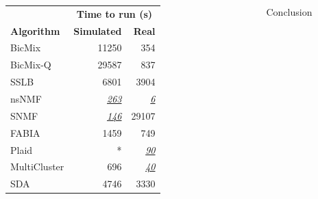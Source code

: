 \documentclass[xcolor=table,final]{beamer}
\newlength{\sepwid}
\newlength{\onecolwid}
\newlength{\twocolwid}
\newcommand{\runnerup}[1] {\underline{\textit{#1}}}
\begin{document}
\begin{frame}[t]
\begin{columns}[t]
\begin{column}{\twocolwid}
\begin{columns}
\begin{column}{\onecolwid}
\begin{table}[t!]
\begin{tabular}{ l | r | r }
    & \multicolumn{2}{c}{\textbf{Time to run (s)}} \\
    \textbf{Algorithm} & \textbf{Simulated} & \textbf{Real} \\ \hline
\cellcolor[HTML]{C50F11}\color[HTML]{FFFFFF}BicMix & 11250 & 354 \\
\cellcolor[HTML]{C50F11}\color[HTML]{FFFFFF}BicMix-Q & 29587 & 837 \\
\cellcolor[HTML]{C50F11}\color[HTML]{FFFFFF}SSLB & 6801 & 3904 \\ \hline
\cellcolor[HTML]{3B93DC}\color[HTML]{FFFFFF}nsNMF & \runnerup{263} & \runnerup{6} \\
\cellcolor[HTML]{3B93DC}\color[HTML]{FFFFFF}SNMF & \runnerup{146} & 29107 \\ \hline
\cellcolor[HTML]{50bd4c}\color[HTML]{FFFFFF}FABIA & 1459 & 749 \\
\cellcolor[HTML]{50bd4c}\color[HTML]{FFFFFF}Plaid & * & \runnerup{90} \\ \hline
\cellcolor[HTML]{7f1c8e}\color[HTML]{FFFFFF}MultiCluster & 696 & \runnerup{40} \\
\cellcolor[HTML]{7f1c8e}\color[HTML]{FFFFFF}SDA & 4746 & 3330 \\

\end{tabular}
\end{table}

\end{column} %
\end{columns} %


\end{column} %

\begin{column}{\sepwid}\end{column} %
\begin{column}{\onecolwid} %


\begin{block}{Conclusion}


\end{block}
\end{column}
\end{columns}
\end{frame}
\end{document}
